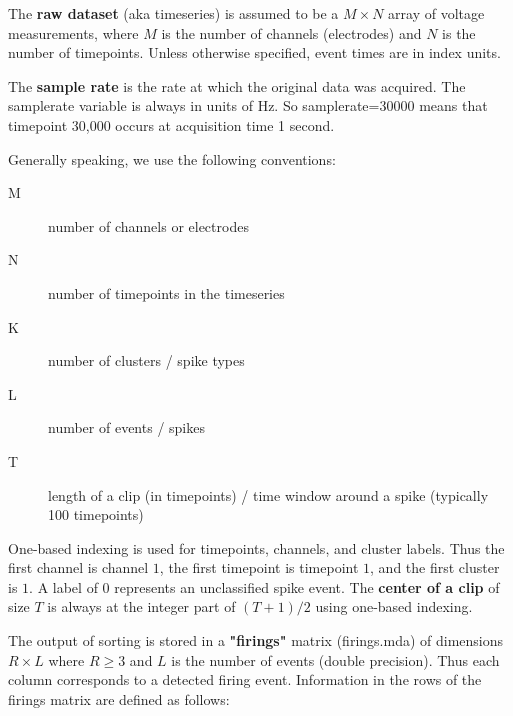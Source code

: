 \documentclass{article}
\begin{document}
The \textbf{raw dataset} (aka timeseries) is assumed to be a $M\times N$ array of voltage measurements, where $M$ is the number of channels (electrodes) and $N$ is the number of timepoints. Unless otherwise specified, event times are in index units.

The \textbf{sample rate} is the rate at which the original data was acquired. The samplerate variable is always in units of Hz. So samplerate=30000 means that timepoint 30,000 occurs at acquisition time 1 second.

Generally speaking, we use the following conventions:

\begin{description}
\item[M] number of channels or electrodes
\item[N] number of timepoints in the timeseries
\item[K] number of clusters / spike types
\item[L] number of events / spikes
\item[T] length of a clip (in timepoints) / time window around a spike (typically 100 timepoints)
\end{description}

One-based indexing is used for timepoints, channels, and cluster labels. Thus the first channel is channel $1$, the first timepoint is timepoint $1$, and the first cluster is $1$. A label of $0$ represents an unclassified spike event. The \textbf{center of a clip} of size $T$ is always at the integer part of $(T+1)/2$ using one-based indexing.

The output of sorting is stored in a \textbf{"firings"} matrix (firings.mda) of dimensions $R\times L$ where $R\geq 3$ and $L$ is the number of events (double precision). Thus each column corresponds to a detected firing event. Information in the rows of the firings matrix are defined as follows:
\end{document}
